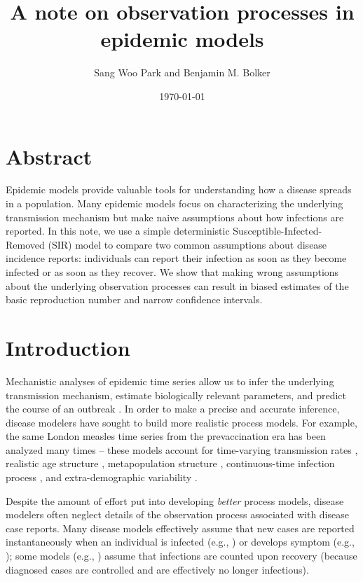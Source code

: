 \documentclass{article}\usepackage[]{graphicx}\usepackage[]{color}
\title{A note on observation processes in epidemic models}
\author{Sang Woo Park and Benjamin M. Bolker}
\date{\today}
\begin{document}
\maketitle

\section*{Abstract}

Epidemic models provide valuable tools for understanding how a disease
spreads in a population. Many epidemic models focus on characterizing
the underlying transmission mechanism but make naive assumptions about
how infections are reported. In this note, we use a simple deterministic
Susceptible-Infected-Removed (SIR) model to compare two common assumptions 
about disease incidence reports: individuals can report their infection as soon as
they become infected or as soon as they recover. We show that making
wrong assumptions about the underlying observation processes can result
in biased estimates of the basic reproduction number and narrow confidence
intervals.

\section{Introduction}

Mechanistic analyses of epidemic time series allow us to infer the underlying 
transmission mechanism, estimate biologically relevant parameters, and 
predict the course of an outbreak \citep{breto2009time}. In order to make a 
precise and accurate inference, disease modelers have sought to build
more realistic process models. For example, the same London measles time 
series from the prevaccination era has been analyzed many times -- 
these models account for time-varying transmission rates \citep{fine1982measles}, 
realistic age structure \citep{schenzle1984age},
metapopulation structure \citep{xia2004measles}, continuous-time infection process 
\citep{cauchemez2008likelihood}, and extra-demographic variability \citep{he2009plug}. 

Despite the amount of effort put into developing \emph{better} process models, disease 
modelers often neglect details of the observation process associated with disease
case reports. Many disease models effectively assume that new cases are reported
instantaneously when an individual is infected (e.g., \cite{martinez2016differential, 
kennedy2018modeling, pons2018serotype}) or develops symptom (e.g., 
\cite{bhadra2011malaria, king2015avoidable}); 
some models (e.g., \cite{breto2009time, he2009plug, lin2016seasonality})
assume that infections are counted upon recovery (because diagnosed cases
are controlled and are effectively no longer infectious). 
\end{document}
